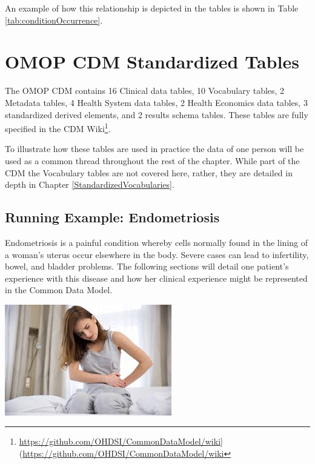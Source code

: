\documentclass[11pt]{book}
\let\rmarkdownfootnote\footnote%
\def\footnote{\protect\rmarkdownfootnote}
\theoremstyle{definition}
\theoremstyle{definition}
\theoremstyle{definition}
\theoremstyle{remark}
\begin{document}
An example of how this relationship is depicted in the tables is shown in Table \ref{tab:conditionOccurrence}.

\hypertarget{omop-cdm-standardized-tables}{%
\section{OMOP CDM Standardized Tables}\label{omop-cdm-standardized-tables}}

The OMOP CDM contains 16 Clinical data tables, 10 Vocabulary tables, 2 Metadata tables, 4 Health System data tables, 2 Health Economics data tables, 3 standardized derived elements, and 2 results schema tables. These tables are fully specified in the CDM Wiki\footnote{\url{https://github.com/OHDSI/CommonDataModel/wiki}{]}(\url{https://github.com/OHDSI/CommonDataModel/wiki}}.

To illustrate how these tables are used in practice the data of one person will be used as a common thread throughout the rest of the chapter. While part of the CDM the Vocabulary tables are not covered here, rather, they are detailed in depth in Chapter \ref{StandardizedVocabularies}.

\hypertarget{running-example-endometriosis}{%
\subsection{Running Example: Endometriosis}\label{running-example-endometriosis}}

Endometriosis is a painful condition whereby cells normally found in the lining of a woman's uterus occur elsewhere in the body. Severe cases can lead to infertility, bowel, and bladder problems. The following sections will detail one patient's experience with this disease and how her clinical experience might be represented in the Common Data Model.

\begin{center}\includegraphics[width=0.5\linewidth]{images/CommonDataModel/Lauren} \end{center}
\end{document}
